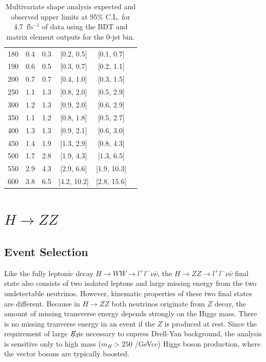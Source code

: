 \documentclass{cmspaper}
\newcommand{\met}{\mbox{$E_T\hspace{-1.1em}/$\hspace{0.7em}}}
\begin{document}
\begin{table}
\begin{center}
\begin{tabular}{c c c c c c}
180 & 0.4 & 0.3 & [0.2, 0.5] & [0.1, 0.7] \\
190 & 0.6 & 0.5 & [0.3, 0.7] & [0.2, 1.1] \\
200 & 0.7 & 0.7 & [0.4, 1.0] & [0.3, 1.5] \\
250 & 1.1 & 1.3 & [0.8, 2.0] & [0.5, 2.9] \\
300 & 1.2 & 1.3 & [0.9, 2.0] & [0.6, 2.9] \\
350 & 1.1 & 1.2 & [0.8, 1.8] & [0.5, 2.7] \\
400 & 1.3 & 1.3 & [0.9, 2.1] & [0.6, 3.0] \\
450 & 1.4 & 1.9 & [1.3, 2.9] & [0.8, 4.3] \\
500 & 1.7 & 2.8 & [1.9, 4.3] & [1.3, 6.5] \\
550 & 2.9 & 4.3 & [2.9, 6.6] & [1.9, 10.3] \\
600 & 3.8 & 6.5 & [4.2, 10.2] & [2.8, 15.6] \\
\hline\hline
\end{tabular}
\end{center}
\caption{Multivariate shape analysis expected and observed upper limits at 95\% C.L.
for 4.7~fb$^{-1}$ of data using the BDT and matrix element outputs for the 0-jet bin.}
\label{tab:me_expected_5fb}
\end{table}




\clearpage
\section{$H \rightarrow ZZ$ }
\subsection{Event Selection}
\label{sec:EvtSelZZ}
Like the fully leptonic decay $H\rightarrow WW \rightarrow l^{+}l^{-}\nu\bar{\nu}$, the $H\rightarrow ZZ\rightarrow l^{+}l^{-}\nu\bar{\nu}$  
final state also consists of two isolated leptons and large missing energy from the two undetectable neutrinos. However, kinematic properties
of these two final states are different. Because in $H\rightarrow ZZ$ both neutrinos originate from $Z$ decay, the amount of missing transverse 
energy depends strongly on the Higgs mass. There is no missing tranverse energy in an event if the $Z$ is produced at rest. Since the
requirement of large \met 
is necessary to supress Drell-Yan background, the analysis is sensitive only to high mass ($m_{H}>250$ /GeVcc) 
Higgs boson production, where the vector bosons are typically boosted. 
 
\end{document}
